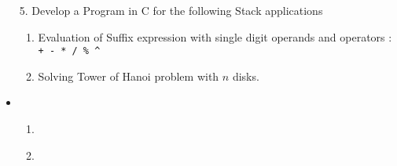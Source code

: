 \documentclass{article}
\newcommand{\answer}{\item [$\rightarrow$]}
\begin{document}
	\begin{itemize}
		\item [5.] Develop a Program in C for the following Stack applications
		\begin{enumerate}[label=\alph*.]
			\item Evaluation of Suffix expression with single digit operands and operators : \\
			\verb|+ - * / % ^|
			\item Solving Tower of Hanoi problem with $n$ disks.
		\end{enumerate}
		\answer
		\begin{enumerate}[label=\alph*.]
			\item \inputminted{c}{../Program5.P.c}
			\item \inputminted{c}{../Program5.H.c}
		\end{enumerate}
	\end{itemize}
\end{document}
